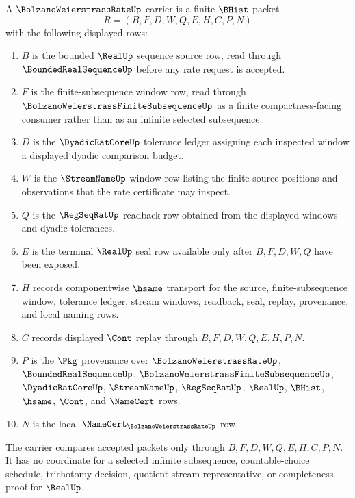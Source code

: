 \begin{definition}
\label{def:bolzano-weierstrass-rate-carrier}
A $\BolzanoWeierstrassRateUp$ carrier is a finite $\BHist$ packet
$$
R=(B,F,D,W,Q,E,H,C,P,N)
$$
with the following displayed rows:
\begin{enumerate}
\item $B$ is the bounded $\RealUp$ sequence source row, read through $\BoundedRealSequenceUp$ before any rate request is accepted.
\item $F$ is the finite-subsequence window row, read through $\BolzanoWeierstrassFiniteSubsequenceUp$ as a finite compactness-facing consumer rather than as an infinite selected subsequence.
\item $D$ is the $\DyadicRatCoreUp$ tolerance ledger assigning each inspected window a displayed dyadic comparison budget.
\item $W$ is the $\StreamNameUp$ window row listing the finite source positions and observations that the rate certificate may inspect.
\item $Q$ is the $\RegSeqRatUp$ readback row obtained from the displayed windows and dyadic tolerances.
\item $E$ is the terminal $\RealUp$ seal row available only after $B,F,D,W,Q$ have been exposed.
\item $H$ records componentwise $\hsame$ transport for the source, finite-subsequence window, tolerance ledger, stream windows, readback, seal, replay, provenance, and local naming rows.
\item $C$ records displayed $\Cont$ replay through $B,F,D,W,Q,E,H,P,N$.
\item $P$ is the $\Pkg$ provenance over $\BolzanoWeierstrassRateUp$, $\BoundedRealSequenceUp$, $\BolzanoWeierstrassFiniteSubsequenceUp$, $\DyadicRatCoreUp$, $\StreamNameUp$, $\RegSeqRatUp$, $\RealUp$, $\BHist$, $\hsame$, $\Cont$, and $\NameCert$ rows.
\item $N$ is the local $\NameCert_{\BolzanoWeierstrassRateUp}$ row.
\end{enumerate}
The carrier compares accepted packets only through $B,F,D,W,Q,E,H,C,P,N$. It has no coordinate for a selected infinite subsequence, countable-choice schedule, trichotomy decision, quotient stream representative, or completeness proof for $\RealUp$.
\end{definition}

